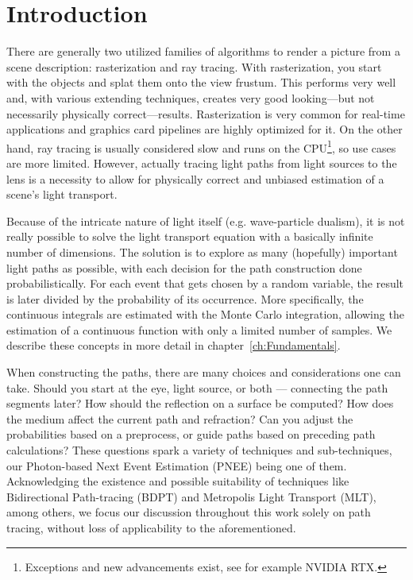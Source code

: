 \chapter{Introduction}
\label{ch:Introduction}

There are generally two utilized families of algorithms to render a picture from a scene description: rasterization and ray tracing. With rasterization, you start with the objects and splat them onto the view frustum. This performs very well and, with various extending techniques, creates very good looking---but not necessarily physically correct---results.  Rasterization is very common for real-time applications and graphics card pipelines are highly optimized for it. On the other hand, ray tracing is usually considered slow and runs on the CPU\footnote{Exceptions and new advancements exist, see for example NVIDIA RTX.}, so use cases are more limited. However, actually tracing light paths from light sources to the lens is a necessity to allow for physically correct and unbiased estimation of a scene's light transport.

Because of the intricate nature of light itself (e.g. wave-particle dualism), it is not really possible to solve the light transport equation with a basically infinite number of dimensions. The solution is to explore as many (hopefully) important light paths as possible, with each decision for the path construction done probabilistically. For each event that gets chosen by a random variable, the result is later divided by the probability of its occurrence. More specifically, the continuous integrals are estimated with the Monte Carlo integration, allowing the estimation of a continuous function with only a limited number of samples. We describe these concepts in more detail in chapter~\ref{ch:Fundamentals}.

When constructing the paths, there are many choices and considerations one can take. Should you start at the eye, light source, or both — connecting the path segments later? How should the reflection on a surface be computed? How does the medium affect the current path and refraction? Can you adjust the probabilities based on a preprocess, or guide paths based on preceding path calculations?
These questions spark a variety of techniques and sub-techniques, our Photon-based Next Event Estimation (PNEE) being one of them. Acknowledging the existence and possible suitability of techniques like Bidirectional Path-tracing (BDPT) and Metropolis Light Transport (MLT), among others, we focus our discussion throughout this work solely on path tracing, without loss of applicability to the aforementioned.

